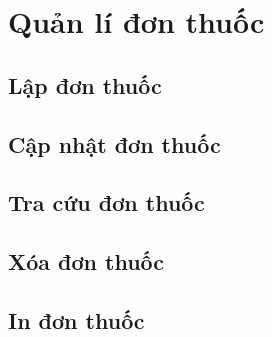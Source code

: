 \section{Quản lí đơn thuốc}

\subsection{Lập đơn thuốc}

\subsection{Cập nhật đơn thuốc}

\subsection{Tra cứu đơn thuốc}

\subsection{Xóa đơn thuốc}

\subsection{In đơn thuốc}